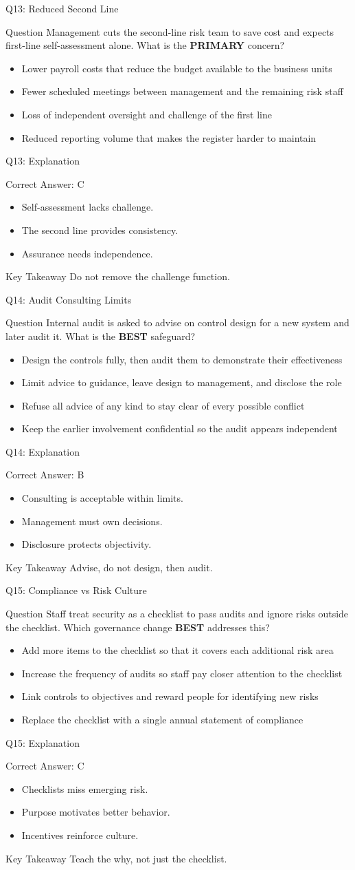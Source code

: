 \documentclass[aspectratio=169]{beamer}
\newcommand{\hq}[7]{%
	\begin{frame}{Q#1: #2}
		\begin{block}{Question}
			#3
		\end{block}
		\begin{itemize}
			#4
		\end{itemize}
	\end{frame}
	\begin{frame}{Q#1: Explanation}
		\begin{block}{Correct Answer: #5}
			\begin{itemize}
				#6
			\end{itemize}
		\end{block}
		\begin{alertblock}{Key Takeaway}
			#7
		\end{alertblock}
	\end{frame}
}
\begin{document}
	\hq{13}{Reduced Second Line}
	{Management cuts the second-line risk team to save cost and expects first-line self-assessment alone. What is the \textbf{PRIMARY} concern?}
	{\item[\textbf{(A)}] Lower payroll costs that reduce the budget available to the business units
		\item[\textbf{(B)}] Fewer scheduled meetings between management and the remaining risk staff
		\item[\textbf{(C)}] Loss of independent oversight and challenge of the first line
		\item[\textbf{(D)}] Reduced reporting volume that makes the register harder to maintain}
	{C}
	{\item Self-assessment lacks challenge.
		\item The second line provides consistency.
		\item Assurance needs independence.}
	{Do not remove the challenge function.}

	\hq{14}{Audit Consulting Limits}
	{Internal audit is asked to advise on control design for a new system and later audit it. What is the \textbf{BEST} safeguard?}
	{\item[\textbf{(A)}] Design the controls fully, then audit them to demonstrate their effectiveness
		\item[\textbf{(B)}] Limit advice to guidance, leave design to management, and disclose the role
		\item[\textbf{(C)}] Refuse all advice of any kind to stay clear of every possible conflict
		\item[\textbf{(D)}] Keep the earlier involvement confidential so the audit appears independent}
	{B}
	{\item Consulting is acceptable within limits.
		\item Management must own decisions.
		\item Disclosure protects objectivity.}
	{Advise, do not design, then audit.}

	\hq{15}{Compliance vs Risk Culture}
	{Staff treat security as a checklist to pass audits and ignore risks outside the checklist. Which governance change \textbf{BEST} addresses this?}
	{\item[\textbf{(A)}] Add more items to the checklist so that it covers each additional risk area
		\item[\textbf{(B)}] Increase the frequency of audits so staff pay closer attention to the checklist
		\item[\textbf{(C)}] Link controls to objectives and reward people for identifying new risks
		\item[\textbf{(D)}] Replace the checklist with a single annual statement of compliance}
	{C}
	{\item Checklists miss emerging risk.
		\item Purpose motivates better behavior.
		\item Incentives reinforce culture.}
	{Teach the why, not just the checklist.}
\end{document}
